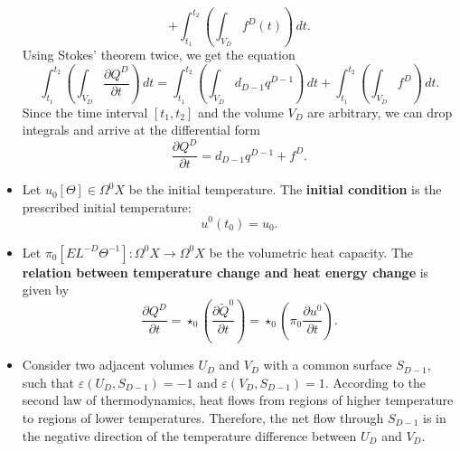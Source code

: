 \begin{discussion}
\begin{itemize}
\begin{equation}
        + \int_{t_1}^{t_2} \left(\int_{V_D} f^D(t) \right)\, d t.
      \end{equation}
      Using Stokes' theorem twice, we get the equation
      \begin{equation}
        \int_{t_1}^{t_2}
          \left(\int_{V_D} \frac{\partial Q^D}{\partial t}\right)\, d t =
          \int_{t_1}^{t_2} \left(\int_{V_D} d_{D - 1} q^{D - 1} \right)\, d t
        + \int_{t_1}^{t_2} \left(\int_{V_D} f^D \right)\, d t.
      \end{equation}
      Since the time interval $[t_1, t_2]$ and the volume $V_D$ are arbitrary,
      we can drop integrals and arrive at the differential form
      \begin{equation}
        \frac{\partial Q^D}{\partial t} = d_{D - 1} q^{D - 1} + f^D.
      \end{equation}
    \item
      Let
        $u_0 [\Theta] \in \Omega^0 X$ be the initial temperature.
      The \textbf{initial condition} is the prescribed initial temperature:
      \begin{equation}
        u^0(t_0) = u_0.
      \end{equation}
    \item
      Let $\pi_0 [E L^{-D} \Theta^{-1}] \colon \Omega^0 X \to \Omega^0 X$
      be the volumetric heat capacity.
      The \textbf{relation between temperature change and heat energy change}
      is given by
      \begin{equation}
        \frac{\partial Q^D}{\partial t}
        = \star_0 \left(\frac{\partial \tilde{Q}^0}{\partial t}\right)
        = \star_0 \left(\pi_0 \frac{\partial u^0}{\partial t}\right).
      \end{equation}
    \item
      Consider two adjacent volumes $U_D$ and $V_D$
      with a common surface $S_{D - 1}$, such that
      $\varepsilon(U_D, S_{D - 1}) = -1$ and
      $\varepsilon(V_D, S_{D - 1}) = 1$.
      According to the second law of thermodynamics, heat flows from regions of
      higher temperature to regions of lower temperatures.
      Therefore, the net flow through $S_{D - 1}$ is in the negative direction
      of the temperature difference between $U_D$ and $V_D$.


\end{itemize}
\end{discussion}
